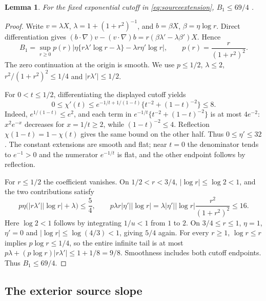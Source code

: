 \documentclass[11pt]{article}
\numberwithin{equation}{section}
\newtheorem{lemma}[theorem]{Lemma}
\begin{document}
\begin{lemma}
For the fixed exponential cutoff in \eqref{eq:sourceextension},
$B_1\le69/4$ \cite{RadialCompactNote}.
\end{lemma}
\begin{proof}
Write $v=\lambda X$, $\lambda=1+(1+r^2)^{-1}$, and
$b=\beta X$, $\beta=\eta\log r$. Direct differentiation gives
$(b\cdot\nabla)v-(v\cdot\nabla)b
=r(\beta\lambda'-\lambda\beta')X$. Hence
\[
 B_1=\sup_{r\ge0}p(r)
 \left|\eta\{r\lambda'\log r-\lambda\}
             -\lambda r\eta'\log r\right|,
 \qquad p(r)=\frac r{(1+r^2)^2}.
\]
The zero continuation at the origin is smooth. We use
$p\le1/2$, $\lambda\le2$, $r^2/(1+r^2)^2\le1/4$ and
$|r\lambda'|\le1/2$.

For $0<t\le1/2$, differentiating the displayed cutoff yields
\[
 0\le\chi'(t)\le e^{-1/t+1/(1-t)}
                 \{t^{-2}+(1-t)^{-2}\}\le8.
\]
Indeed, $e^{1/(1-t)}\le e^2$, and each term in
$e^{-1/t}\{t^{-2}+(1-t)^{-2}\}$ is at most $4e^{-2}$:
$x^2e^{-x}$ decreases for $x=1/t\ge2$, while
$(1-t)^{-2}\le4$. Reflection
$\chi(1-t)=1-\chi(t)$ gives the same bound on the other half.
Thus $0\le\eta'\le32$. The constant extensions are smooth and flat;
near $t=0$ the denominator tends to $e^{-1}>0$ and the numerator
$e^{-1/t}$ is flat, and the other endpoint follows by reflection.

For $r\le1/2$ the coefficient vanishes. On $1/2<r<3/4$,
$|\log r|\le\log2<1$, and the two contributions satisfy
\[
 p\eta\bigl(|r\lambda'||\log r|+\lambda\bigr)\le\frac54,
 \qquad
 p\lambda r|\eta'||\log r|
 =\lambda|\eta'||\log r|\frac{r^2}{(1+r^2)^2}\le16.
\]
Here $\log2<1$ follows by integrating $1/u<1$ from $1$ to $2$.
On $3/4\le r\le1$, $\eta=1$, $\eta'=0$ and
$|\log r|\le\log(4/3)<1$, giving $5/4$ again.
For every $r\ge1$, $\log r\le r$ implies $p\log r\le1/4$,
so the entire infinite tail is at most
$p\lambda+(p\log r)|r\lambda'|\le1+1/8=9/8$.
Smoothness includes both cutoff endpoints. Thus $B_1\le69/4$.

\end{proof}

\subsection{The exterior source slope}\label{app:sourceslope}
\end{document}
